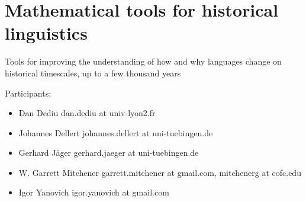 
\section{Mathematical tools for historical linguistics}

Tools for improving the understanding of how and why languages change on historical timescales, up to a few thousand years

Participants:
\begin{itemize}
\item Dan Dediu dan.dediu at univ-lyon2.fr
\item Johannes Dellert johannes.dellert at uni-tuebingen.de
\item Gerhard Jäger gerhard.jaeger at uni-tuebingen.de
\item W. Garrett Mitchener garrett.mitchener at gmail.com, mitchenerg at cofc.edu
\item Igor Yanovich igor.yanovich at gmail.com
\end{itemize}

